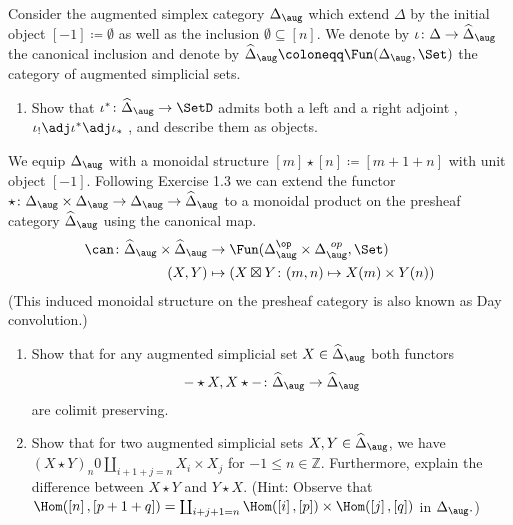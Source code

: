 \begin{Exercise}
	Consider the augmented simplex category $ \Delta_{ \aug } $ which extend $ \Delta $ by the initial object $ \left[ - 1 \right] \coloneqq \emptyset $ as well as the inclusion $ \emptyset \subseteq \left[ n \right] $.
	We denote by $ \iota \colon \Delta \to \widehat{\Delta}_{ \aug } $ the canonical inclusion and denote by $ \widehat{ \Delta }_{ \aug } \coloneqq \Fun ( \Delta_{ \aug } , \Set ) $ the category of augmented simplicial sets.
	
	\begin{enumerate}[label=(\alph*)]
		\item 
		Show that $ \iota^* \colon \widehat{\Delta}_{ \aug }
		\to \SetD $ admits both a left and a right adjoint , $ \iota_! \adj \iota^* \adj \iota_* $ , and describe them as objects. 
	\end{enumerate}
	
	We equip $ \Delta_{ \aug } $  with a monoidal structure $ \left[ m \right] \star \left[ n \right] \coloneqq \left[ m + 1 + n \right] $ with unit object $ \left[ - 1 \right] $.
	Following Exercise 1.3 we can extend the functor $ \star \colon \Delta_{ \aug } \times \Delta_{ \aug } \to \Delta_{ \aug } \to \widehat{ \Delta }_{ \aug } $ to a monoidal product on the presheaf category $ \widehat{ \Delta }_{ \aug } $ using the canonical map.
	\begin{align*}
		\can \colon \widehat{ \Delta }_{ \aug } \times \widehat{ \Delta }_{ \aug } 
		&\to 
		\Fun ( \Delta^{ \op }_{ \aug } \times \Delta^{ \ op }_{ \aug } , \Set ) 
		\\
		( X , Y )
		&\mapsto
		( X \boxtimes Y \colon ( m , n ) \mapsto X ( m ) \times Y ( n ) )
	\end{align*}
	(This induced monoidal structure on the presheaf category is also known as Day convolution.)
	
	\begin{enumerate}[label=(\alph*),resume]
		\item 
		Show that for any augmented simplicial set $ X \in \widehat{ \Delta }_{ \aug } $ both functors 
		\[
		- \star X , X \star - \colon 
		\widehat{ \Delta }_{ \aug }
		\to 
		\widehat{ \Delta }_{ \aug }
		\]
		are colimit preserving.
		
		\item 
		Show that for two augmented simplicial sets $ X , Y \in \widehat{ \Delta }_{ \aug }$, we have $ ( X \star Y )_n 0 
		\coprod_{ i + 1 + j = n } X_i \times X_j $ for $ - 1 \leq n \in \mathbb{ Z } $. 
		Furthermore, explain the difference between $ X \star Y $ and $ Y \star X $.
		\newline
		(Hint: Observe that $ \Hom ( \left[	n \right] , \left[	p + 1 + q \right] ) = \coprod_{ i + j + 1 = n } \Hom ( \left[ i \right] , \left[ p \right ] ) \times \Hom ( \left[ j \right] , \left[ q \right] ) $ in $ \Delta_{ \aug } .$)
	\end{enumerate}	
	

\end{Exercise}
